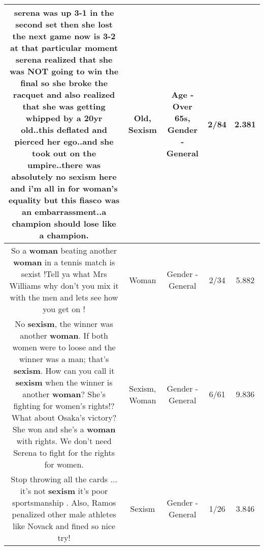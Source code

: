 \documentclass[11pt]{article}
\newlength\mylength
\begin{document}
\begin{center}
\begin{longtable}{|C{.65\mylength}|C{.30\mylength}|C{.12\mylength}|C{.12\mylength}|C{.12\mylength}|}
  \small serena was up 3-1 in the second set then she lost the next game now is 3-2 at that particular moment serena realized that she was NOT going to win the final so she broke the racquet and also realized that she was getting whipped by a 20yr \textbf{old}..this deflated and pierced her ego..and she took out on the umpire..there was absolutely no \textbf{sexism} here and i'm all in for woman's equality but this fiasco was an embarrassment..a champion should lose like a champion.\normalsize   & Old, Sexism & Age - Over 65s, Gender - General & 2/84 & 2.381 \\  \hline
  \small So a \textbf{woman} beating another \textbf{woman} in a tennis match is sexist !Tell ya what Mrs Williams why don't you mix it with the men and lets see how you get on !\normalsize   & Woman & Gender - General & 2/34 & 5.882 \\  \hline
  \small No \textbf{sexism}, the winner was another \textbf{woman}. If both women were to loose and the winner was a man; that's \textbf{sexism}. How can you call it \textbf{sexism} when the winner is another \textbf{woman}? She's fighting for women's rights!? What about Osaka's victory? She won and she's a \textbf{woman} with rights. We don't need Serena to fight for the rights for women.\normalsize   & Sexism, Woman & Gender - General & 6/61 & 9.836 \\  \hline
  \small Stop throwing all the cards ... it's not \textbf{sexism} it's poor sportsmanship . Also, Ramos penalized other male athletes like Novack and fined so nice try!\normalsize   & Sexism & Gender - General & 1/26 & 3.846 \\  \hline

\end{longtable}
\end{center}
\end{document}

